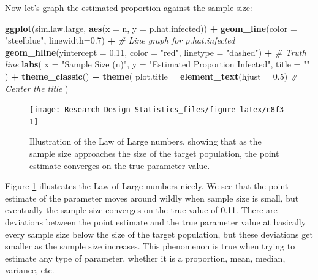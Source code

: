 \documentclass[
]{book}
\newenvironment{Shaded}{\begin{snugshade}}{\end{snugshade}}
\newcommand{\AttributeTok}[1]{\textcolor[rgb]{0.13,0.29,0.53}{#1}}
\newcommand{\CommentTok}[1]{\textcolor[rgb]{0.56,0.35,0.01}{\textit{#1}}}
\newcommand{\FloatTok}[1]{\textcolor[rgb]{0.00,0.00,0.81}{#1}}
\newcommand{\FunctionTok}[1]{\textcolor[rgb]{0.13,0.29,0.53}{\textbf{#1}}}
\newcommand{\NormalTok}[1]{#1}
\newcommand{\SpecialCharTok}[1]{\textcolor[rgb]{0.81,0.36,0.00}{\textbf{#1}}}
\newcommand{\StringTok}[1]{\textcolor[rgb]{0.31,0.60,0.02}{#1}}
\begin{document}
Now let's graph the estimated proportion against the sample size:

\begin{Shaded}
\begin{Highlighting}[]
\FunctionTok{ggplot}\NormalTok{(sim.law.large, }\FunctionTok{aes}\NormalTok{(}\AttributeTok{x =}\NormalTok{ n, }\AttributeTok{y =}\NormalTok{ p.hat.infected)) }\SpecialCharTok{+}
  \FunctionTok{geom\_line}\NormalTok{(}\AttributeTok{color =} \StringTok{"steelblue"}\NormalTok{, }\AttributeTok{linewidth=}\FloatTok{0.7}\NormalTok{) }\SpecialCharTok{+}  \CommentTok{\# Line graph for p.hat.infected}
  \FunctionTok{geom\_hline}\NormalTok{(}\AttributeTok{yintercept =} \FloatTok{0.11}\NormalTok{, }\AttributeTok{color =} \StringTok{"red"}\NormalTok{, }\AttributeTok{linetype =} \StringTok{"dashed"}\NormalTok{) }\SpecialCharTok{+}  \CommentTok{\# Truth line}
  \FunctionTok{labs}\NormalTok{(}
    \AttributeTok{x =} \StringTok{"Sample Size (n)"}\NormalTok{, }
    \AttributeTok{y =} \StringTok{"Estimated Proportion Infected"}\NormalTok{, }
    \AttributeTok{title =} \StringTok{""}
\NormalTok{  ) }\SpecialCharTok{+}
  \FunctionTok{theme\_classic}\NormalTok{() }\SpecialCharTok{+}
  \FunctionTok{theme}\NormalTok{(}
    \AttributeTok{plot.title =} \FunctionTok{element\_text}\NormalTok{(}\AttributeTok{hjust =} \FloatTok{0.5}\NormalTok{)  }\CommentTok{\# Center the title}
\NormalTok{  )}
\end{Highlighting}
\end{Shaded}

\begin{figure}

{\centering \texttt{[image: Research-Design---Statistics\_files/figure-latex/c8f3-1]} 

}

\caption{Illustration of the Law of Large numbers, showing that as the sample size approaches the size of the target population, the point estimate converges on the true parameter value.}\label{fig:c8f3}
\end{figure}

Figure \ref{fig:c8f3} illustrates the Law of Large numbers nicely. We see that the point estimate of the parameter moves around wildly when sample size is small, but eventually the sample size converges on the true value of 0.11. There are deviations between the point estimate and the true parameter value at basically every sample size below the size of the target population, but these deviations get smaller as the sample size increases. This phenomenon is true when trying to estimate any type of parameter, whether it is a proportion, mean, median, variance, etc.
\end{document}
